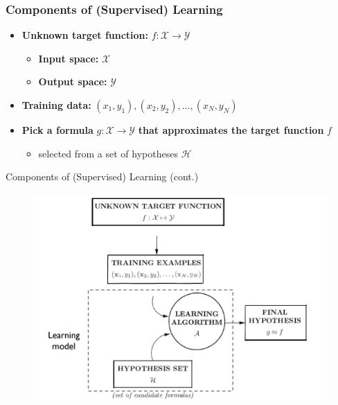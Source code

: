 \documentclass[serif, aspectratio=169]{beamer}
\begin{document}
\begin{frame}
    \frametitle{Components of (Supervised) Learning}

    \begin{itemize}
        \item \textbf{Unknown target function:} \( f : \mathcal{X} \to \mathcal{Y} \)
        \begin{itemize}
            \item \textbf{Input space:} \( \mathcal{X} \)
            \item \textbf{Output space:} \( \mathcal{Y} \)
        \end{itemize}
        
        \vspace{0.5cm} %
        
        \item \textbf{Training data:} \( (x_1, y_1), (x_2, y_2), \ldots, (x_N, y_N) \)
        
        \vspace{0.5cm}
        
        \item \textbf{Pick a formula} \( g : \mathcal{X} \to \mathcal{Y} \) \textbf{that approximates the target function} \( f \)
        \begin{itemize}
            \item selected from a set of hypotheses \( \mathcal{H} \)
        \end{itemize}
    \end{itemize}
    
\end{frame}

\begin{frame}{Components of (Supervised) Learning (cont.)}
    \begin{minipage}{0.95\textwidth}
        \begin{figure}[h]
          \centering
          \includegraphics[width=0.7\linewidth]{pic/4.png}
        \end{figure}
    \end{minipage}
    \vfill
\end{frame}
\end{document}
